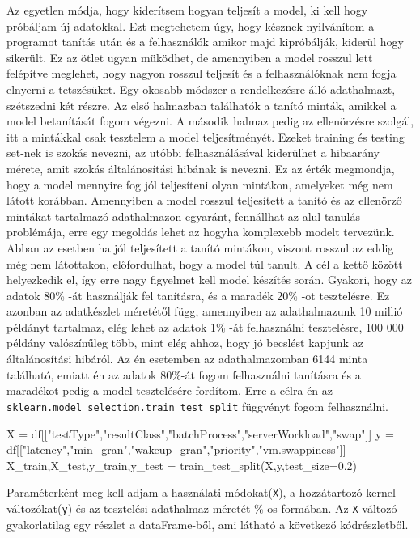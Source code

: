 Az egyetlen módja, hogy kiderítsem hogyan teljesít a model, ki kell hogy próbáljam új adatokkal. 
Ezt megtehetem úgy, hogy késznek nyilvánítom a programot tanítás után és a felhasználók amikor majd kipróbálják, kiderül hogy sikerült. Ez az ötlet ugyan müködhet, de amennyiben a model rosszul lett felépítve meglehet, hogy nagyon rosszul teljesít és a felhasználóknak nem fogja elnyerni a tetszésüket. Egy okosabb módszer a rendelkezésre álló adathalmazt, szétszedni két részre. Az első halmazban találhatók a tanító minták, amikkel a model betanítását fogom végezni. A második halmaz pedig az ellenörzésre szolgál, itt a mintákkal csak tesztelem a model teljesítményét.
Ezeket training és testing set-nek is szokás nevezni, az utóbbi felhasználásával kiderülhet a hibaarány mérete, amit szokás általánosítási hibának is nevezni. Ez az érték megmondja, hogy a model mennyire fog jól teljesíteni olyan mintákon, amelyeket még nem látott korábban.
Amennyiben a model rosszul teljesített a tanító és az ellenörző mintákat tartalmazó adathalmazon egyaránt, fennállhat az alul tanulás problémája, erre egy megoldás lehet az hogyha komplexebb modelt tervezünk. Abban az esetben ha jól teljesített a tanító mintákon, viszont rosszul az eddig még nem látottakon, előfordulhat, hogy a model túl tanult. A cél a kettő között helyezkedik el, így erre nagy figyelmet kell model készítés során.
Gyakori, hogy az adatok 80\% -át használják fel tanításra, és a maradék 20\% -ot tesztelésre. Ez azonban az adatkészlet méretétől függ, amennyiben az adathalmazunk 10 millió példányt tartalmaz, elég lehet az adatok 1\% -át felhasználni tesztelésre, 100 000 példány valószínűleg több, mint
elég ahhoz, hogy jó becslést kapjunk az általánosítási hibáról. Az én esetemben az adathalmazomban 6144 minta található, emiatt én az adatok 80\%-át fogom felhasználni tanításra és a maradékot pedig a model tesztelésére fordítom. Erre a célra én az \texttt{sklearn.model\_selection.train\_test\_split} függvényt fogom felhasználni. 

\begin{python}
X = df[["testType","resultClass","batchProcess","serverWorkload","swap"]]
y = df[["latency","min_gran","wakeup_gran","priority","vm.swappiness"]]
X_train,X_test,y_train,y_test = train_test_split(X,y,test_size=0.2)
\end{python}

Paraméterként meg kell adjam a használati módokat(\texttt{X}), a hozzátartozó kernel változókat(\texttt{y}) és az tesztelési adathalmaz méretét \%-os formában.
Az \texttt{X} változó gyakorlatilag egy részlet a dataFrame-ből, ami látható a következő kódrészletből.

